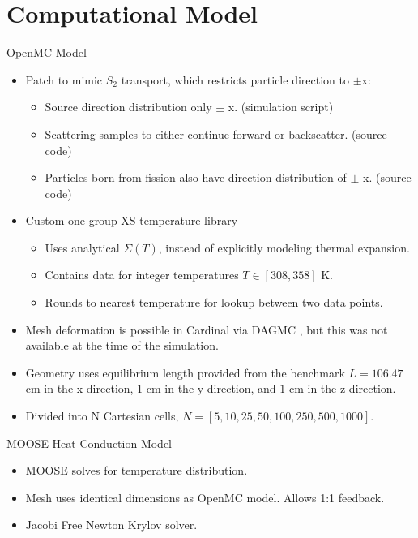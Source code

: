 \documentclass[9pt,t]{beamer}
\begin{document}
\section{Computational Model}
\begin{frame}{OpenMC Model}
    \pause
    \begin{itemize}
        \item<2-> Patch to mimic $S_{2}$ transport, which restricts particle direction to $\pm$x:
        \begin{itemize}
            \item<3-> Source direction distribution only $\pm$ x. (simulation script)
            \item<4-> Scattering samples to either continue forward or backscatter. (source code)
            \item<5-> Particles born from fission also have direction distribution of $\pm$ x. (source code)
        \end{itemize}
        \item<6-> Custom one-group XS temperature library
        \begin{itemize}
            \item<7-> Uses analytical $\Sigma(T)$, instead of explicitly modeling thermal expansion.
            \item<8-> Contains data for integer temperatures $T\in[308,358]$ K.
            \item<9-> Rounds to nearest temperature for lookup between two data points.
        \end{itemize}
        \item<10-> Mesh deformation is possible in Cardinal via DAGMC \cite{novak-2023}, but this was not available at the time of the simulation.
        \item<11-> Geometry uses equilibrium length provided from the benchmark $L=106.47$ cm in the x-direction, $1$ cm in the y-direction, and $1$ cm in the z-direction.
        \item<12-> Divided into N Cartesian cells, $N=[5, 10, 25, 50, 100, 250, 500, 1000]$.
    \end{itemize}
\end{frame}

\begin{frame}{MOOSE Heat Conduction Model}
    \pause
    \begin{itemize}
        \item <2-> MOOSE solves for temperature distribution.
        \item <3-> Mesh uses identical dimensions as OpenMC model. Allows 1:1 feedback.
        \item <4-> Jacobi Free Newton Krylov solver.
    \end{itemize}
\end{frame}
\end{document}
